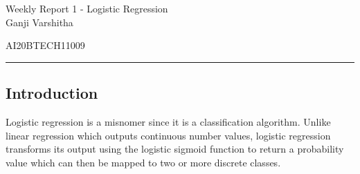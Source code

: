 \documentclass[12pt,letterpaper, onecolumn]{exam}
\begin{document}
\newtheorem{theorem}{Theorem}[section]
\newtheorem{problem}{Problem}
\newtheorem{proposition}{Proposition}[section]
\newtheorem{lemma}{Lemma}[section]
\newtheorem{corollary}[theorem]{Corollary}
\newtheorem{example}{Example}[section]
\newtheorem{definition}[problem]{Definition}

\newcommand{\BEQA}{\begin{eqnarray}}
\newcommand{\EEQA}{\end{eqnarray}}
\newcommand{\define}{\stackrel{\triangle}{=}}

\raggedbottom
\setlength{\parindent}{0pt}
\providecommand{\mbf}{\mathbf}
\providecommand{\norm}[1]{\lVert#1\rVert}
\providecommand{\pr}[1]{\ensuremath{\Pr\left(#1\right)}}
\providecommand{\qfunc}[1]{\ensuremath{Q\left(#1\right)}}
\providecommand{\sbrak}[1]{\ensuremath{{}\left[#1\right]}}
\providecommand{\lsbrak}[1]{\ensuremath{{}\left[#1\right.}}
\providecommand{\rsbrak}[1]{\ensuremath{{}\left.#1\right]}}
\providecommand{\brak}[1]{\ensuremath{\left(#1\right)}}
\providecommand{\lbrak}[1]{\ensuremath{\left(#1\right.}}
\providecommand{\rbrak}[1]{\ensuremath{\left.#1\right)}}
\providecommand{\cbrak}[1]{\ensuremath{\left\{#1\right\}}}
\providecommand{\lcbrak}[1]{\ensuremath{\left\{#1\right.}}
\providecommand{\rcbrak}[1]{\ensuremath{\left.#1\right\}}}
\let\vec\mathbf




\begingroup  
    \centering
    
    \LARGE Weekly Report 1 - Logistic Regression\\[0.5em]
    
    \large Ganji Varshitha\par
    \large AI20BTECH11009\par
\endgroup
\rule{\textwidth}{0.4pt}
\pointsdroppedatright   %
\printanswers
\newcommand\Solution{
  \textbf{Solution:}\hspace{3mm}}
\newcommand{\myvec}[1]{\ensuremath{\begin{bmatrix}#1\end{bmatrix}}}

\subsection*{Introduction}
Logistic regression is a misnomer since it is a classification algorithm. Unlike linear regression which outputs continuous number values, logistic regression transforms its output using the logistic sigmoid function to return a probability value which can then be mapped to two or more discrete classes.
\end{document}
